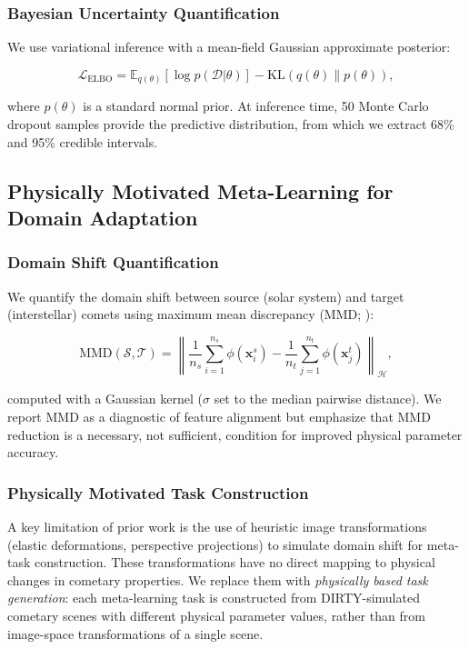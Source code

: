 \documentclass[usenatbib]{mnras}
\begin{document}
\subsubsection{Bayesian Uncertainty Quantification}

We use variational inference with a mean-field Gaussian approximate posterior:

\begin{equation}\label{eq:elbo}
\mathcal{L}_{\text{ELBO}} = \mathbb{E}_{q(\theta)}[\log p(\mathcal{D}|\theta)] - \text{KL}(q(\theta) \| p(\theta)),
\end{equation}

where $p(\theta)$ is a standard normal prior. At inference time, 50 Monte Carlo dropout samples \citep{gal16} provide the predictive distribution, from which we extract 68\% and 95\% credible intervals.

\subsection{Physically Motivated Meta-Learning for Domain Adaptation}\label{sec:domain_adapt}

\subsubsection{Domain Shift Quantification}

We quantify the domain shift between source (solar system) and target (interstellar) comets using maximum mean discrepancy (MMD; \citealt{gretton12}):

\begin{equation}\label{eq:mmd}
\text{MMD}(\mathcal{S}, \mathcal{T}) = \left\| \frac{1}{n_s}\sum_{i=1}^{n_s} \phi(\mathbf{x}_i^s) - \frac{1}{n_t}\sum_{j=1}^{n_t} \phi(\mathbf{x}_j^t) \right\|_{\mathcal{H}},
\end{equation}

computed with a Gaussian kernel ($\sigma$ set to the median pairwise distance). We report MMD as a diagnostic of feature alignment but emphasize that MMD reduction is a necessary, not sufficient, condition for improved physical parameter accuracy.

\subsubsection{Physically Motivated Task Construction}

A key limitation of prior work is the use of heuristic image transformations (elastic deformations, perspective projections) to simulate domain shift for meta-task construction. These transformations have no direct mapping to physical changes in cometary properties. We replace them with \textit{physically based task generation}: each meta-learning task is constructed from DIRTY-simulated cometary scenes with different physical parameter values, rather than from image-space transformations of a single scene.
\end{document}
